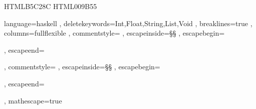 

\usepackage{xcolor}
\definecolor{YellowGreen} {HTML}{B5C28C}
\definecolor{ForestGreen} {HTML}{009B55}


\usepackage{xltxtra} %

\newfontfamily{}
\newfontfamily{}

\usepackage{listings}
{ language=haskell
         , deletekeywords={Int,Float,String,List,Void}
         , breaklines=true
         , columns=fullflexible
         , commentstyle=\color{ForestGreen}
         , escapeinside=§§
         , escapebegin=\begin{russian}\commentfont
         , escapeend=\end{russian}
         , commentstyle=\color{ForestGreen}
         , escapeinside=§§
         , escapebegin=\begin{russian}\color{ForestGreen}
         , escapeend=\end{russian}
         , mathescape=true
}

